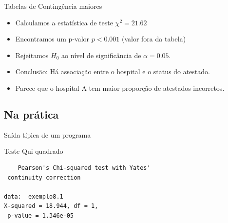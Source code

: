 \documentclass{beamer}
\begin{document}
\begin{frame}{\scriptsize Tabelas de Contingência maiores}
  \begin{itemize}
  \item Calculamos a estatística de teste $\chi^2 = 21.62$
  \item Encontramos um p-valor $p<0.001$ (valor fora da tabela)
  \item Rejeitamos $H_0$ ao nível de significância de $\alpha = 0.05$.
  \item Conclusão: Há associação entre o hospital e o status do atestado.
  \item Parece que o hospital A tem maior proporção de atestados incorretos.
  \end{itemize}
\end{frame}





\subsection{Na prática}


\begin{frame}[fragile]{\scriptsize Saída típica de um programa}
  \begin{block}{Teste Qui-quadrado}
    \footnotesize
\begin{verbatim}
	Pearson's Chi-squared test with Yates'
 continuity correction

data:  exemplo8.1
X-squared = 18.944, df = 1,
 p-value = 1.346e-05
\end{verbatim}
  \end{block}
\end{frame}
\end{document}
